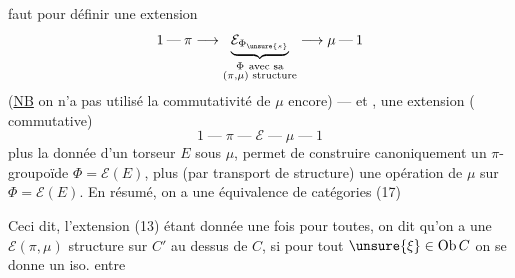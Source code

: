 faut pour définir une extension
\[
1\mathbin{\text{---}}\pi\longrightarrow
\underbrace{\mathcal E_{\Phi_{\unsure{s}}}}_{\substack{\Phi\ \text{avec sa}\\(\pi,\mu)\text{ structure}}}
\longrightarrow\mu\mathbin{\text{---}}1
\]
(\uline{NB} on n'a pas utilisé la commutativité de $\mu$
encore) --- et , une  extension
( commutative)
\[
1\mathbin{\text{---}}\pi\mathbin{\text{---}}\mathcal E\mathbin{\text{---}}\mu\mathbin{\text{---}}1
\]
plus la donnée d'un torseur $E$ sous $\mu$,
permet de construire canoniquement un
$\pi$-groupoïde $\Phi=\mathcal E(E)$, plus (par transport
de structure) une opération de $\mu$ sur
$\Phi=\mathcal E(E)$. En résumé, on a 
une équivalence de catégories
\quad(17)

Ceci dit, l'extension (13) étant donnée
une fois pour toutes, on dit qu'on a
une $\mathcal E(\pi,\mu)$ structure sur $C'$ au dessus de
$C$, si 
pour tout $\unsure{\xi}\in\operatorname{Ob}C$ on se donne un iso. entre
